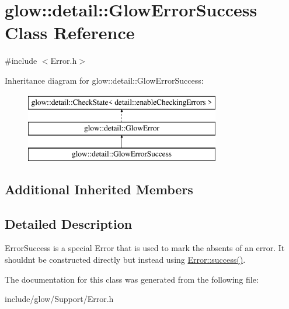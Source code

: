 \hypertarget{classglow_1_1detail_1_1_glow_error_success}{}\section{glow\+:\+:detail\+:\+:Glow\+Error\+Success Class Reference}
\label{classglow_1_1detail_1_1_glow_error_success}


{\ttfamily \#include $<$Error.\+h$>$}

Inheritance diagram for glow\+:\+:detail\+:\+:Glow\+Error\+Success\+:\begin{figure}[H]
\begin{center}
\leavevmode
\includegraphics[height=3.000000cm]{classglow_1_1detail_1_1_glow_error_success}
\end{center}
\end{figure}
\subsection*{Additional Inherited Members}


\subsection{Detailed Description}
Error\+Success is a special Error that is used to mark the absents of an error. It shouldn\textquotesingle{}t be constructed directly but instead using \hyperlink{classglow_1_1detail_1_1_glow_error_ace73703b37f7e894290547c34927dba7}{Error\+::success()}. 

The documentation for this class was generated from the following file\+:\begin{DoxyCompactItemize}
\item 
include/glow/\+Support/Error.\+h\end{DoxyCompactItemize}
